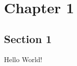 \newcommand*{\getTitle}{Hello World!}
\newcommand*{\getAuthor}{Polly Parrot}





\maketitle

\tableofcontents{}

\chapter{Chapter 1}
\section{Section 1}
Hello World!\parencite{sample2023}

\appendix{}
\printbibliography{}


